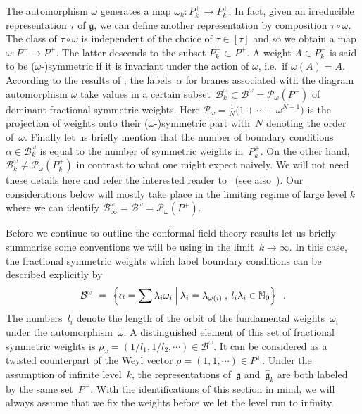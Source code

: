 \documentclass[12pt,a4paper]{article}
\newcommand{\proj}{\mc{P}_{\!\!\omega}}
\newcommand{\Natural}{\mathbb{N}}
\newcommand{\mf}{\mathfrak} %
\newcommand{\mc}{\mathcal} %
\def\bL{\mc{B}} %
\def\areps{P_k^+} %
\def\reps{P^+} %
\def\tareps{\bL^\omega_k} %
\def\treps{\bL^\omega} %
\def\asg{{\hat{\mf{g}}}}
\begin{document}
The automorphism $\omega$ generates a map $\omega_k:\areps
\rightarrow\areps$. In fact, given an irreducible representation 
$\tau$ of $\mf{g}$, we can define another representation by 
composition $\tau\circ\omega$. The class of $\tau \circ \omega$ 
is independent of the choice of $\tau \in [\tau]$ and so we obtain 
a map $\omega:\reps\rightarrow\reps$. The latter descends to 
the subset $\areps\subset\reps$. A weight $A\in\areps$ is said 
to be ($\omega$-)symmetric if it is invariant under the action of 
$\omega$, i.e.\ if $\omega(A)=A$. According to the results of 
\cite{Cardy:1989ir, Birke:1999ik}, the labels~$\alpha$ for 
branes associated with the diagram automorphism $\omega$ take 
values in a certain subset~$\tareps\subset\treps=\proj(P^+)$
of dominant fractional symmetric weights. Here $\proj =
\frac{1}{N}\bigl(1+\cdots+\omega^{N-1}\bigr) $ is the projection of weights 
onto their ($\omega$-)symmetric part with~$N$ denoting the order 
of~$\omega$. Finally let us briefly mention that the number of boundary
conditions~$\alpha\in\tareps$ is equal to the number of symmetric
weights in~$\areps$. On the other hand, $\tareps\neq\proj(P_k^+)$ 
in contrast to what one might expect naively. We will not need these 
details here and refer the interested reader to~\cite{Birke:1999ik} (see 
also~\cite{Quella:2002wi}). Our considerations below will mostly 
take place in the limiting regime of large level $k$ where we can 
identify $\treps_{\infty}=\treps=\proj(P^+)$. 
\smallskip

Before we continue to outline the conformal field theory 
results let us briefly summarize some conventions we will
be using in the limit~$k\rightarrow\infty$. In this case, 
the fractional symmetric weights which label boundary 
conditions can be described explicitly by
\begin{equation}
\treps\ =\ \Bigl\{\alpha=\sum\lambda_i\omega_i\:\Bigl|\:
\lambda_i=\lambda_{\omega(i)}\:,\: l_i\lambda_i\in\Natural_0\Bigr\}\ \ .
\end{equation}
The numbers~$l_i$ denote the length of the orbit of the
fundamental weights~$\omega_i$ under the automorphism~$\omega$.
A distinguished element of this set of fractional symmetric
weights is $\rho_\omega=(1/l_1,1/l_2,\cdots)\in\treps$. It can 
be considered as a twisted counterpart of the Weyl vector 
$\rho=(1,1,\cdots)\in\reps$. Under the assumption of infinite 
level~$k$, the representations of~$\mf{g}$ and~$\asg_k$ are 
both labeled by the same set~$\reps$. With the identifications 
of this section in mind, we will always assume that we fix the 
weights before we let the level run to infinity.
\medskip
\end{document}
